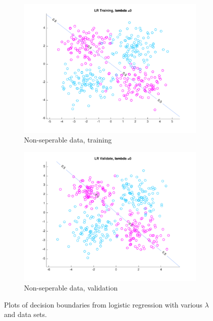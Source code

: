 \begin{figure}[h!]
    \begin{subfigure}[b]{0.4\textwidth}
	\includegraphics[scale=0.4]{hw2_1_nonsep_a_0.pdf}
	\caption{Non-seperable data, training}\label{fig:data_nonsep_a}
    \end{subfigure}  
    \quad
    \begin{subfigure}[b]{0.4\textwidth}
	\includegraphics[scale=0.4]{hw2_1_nonsep_b_0.pdf}
	\caption{Non-seperable data, validation}\label{fig:data_nonsep_b}
    \end{subfigure}  
    \caption{Plots of decision boundaries from logistic regression with various $\lambda$ and data sets.}  \label{fig:LR_plots}  
\end{figure}



